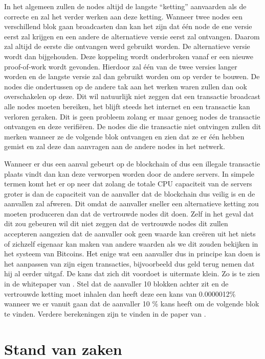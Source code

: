 In het algemeen zullen de nodes altijd de langste ``ketting'' aanvaarden als de correcte en zal het verder werken aan deze ketting. Wanneer twee nodes een verschillend blok gaan broadcasten dan kan het zijn dat één node de ene versie eerst zal krijgen en een andere de alternatieve versie eerst zal ontvangen. Daarom zal altijd de eerste die ontvangen werd gebruikt worden. De alternatieve versie wordt dan bijgehouden. Deze koppeling wordt onderbroken vanaf er een nieuwe proof-of-work wordt gevonden. Hierdoor zal één van de twee versies langer worden en de langste versie zal dan gebruikt worden om op verder te bouwen. De nodes die ondertussen op de andere tak aan het werken waren zullen dan ook overschakelen op deze. Dit wil natuurlijk niet zeggen dat een transactie broadcast alle nodes moeten bereiken, het blijft steeds het internet en een transactie kan verloren geraken. Dit is geen probleem zolang er maar genoeg nodes de transactie ontvangen en deze verifiëren. De nodes die die transactie niet ontvingen zullen dit merken wanneer ze de volgende blok ontvangen en zien dat ze er één hebben gemist en zal deze dan aanvragen aan de andere nodes in het netwerk. 

 Wanneer er dus een aanval gebeurt op de blockchain of dus een illegale transactie plaats vindt dan kan deze verworpen worden door de andere servers. In simpele termen komt het er op neer dat zolang de totale CPU capaciteit van de servers groter is dan de capaciteit van de aanvaller dat de blockchain dus veilig is en de aanvallen zal afweren. Dit omdat de aanvaller sneller een alternatieve ketting zou moeten produceren  dan dat de vertrouwde nodes dit doen. Zelf in het geval dat dit zou gebeuren wil dit niet zeggen dat de vertrouwde nodes dit zullen accepteren aangezien dat de aanvaller ook geen waarde kan creëren uit het niets of zichzelf eigenaar kan maken van andere waarden als we dit zouden bekijken in het systeem van Bitcoins. Het enige wat een aanvaller dus in principe kan doen is het aanpassen van zijn eigen transacties, bijvoorbeeld dus geld terug nemen dat hij al eerder uitgaf. De kans dat zich dit voordoet is uitermate klein. Zo is te zien in de whitepaper van \textcite{Nakamoto2008}. Stel dat de aanvaller 10 blokken achter zit en de vertrouwde ketting moet inhalen dan heeft deze een kans van 0.0000012\% wanneer we er vanuit gaan dat de aanvaller 10 \% kans heeft om de volgende blok te vinden. Verdere berekeningen zijn te vinden in de paper van \autocite{Nakamoto2008}.

\section{Stand van zaken}
\label{sec:stand-van-zaken}

